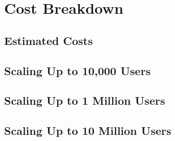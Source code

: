 \chapter{Cost Breakdown}
\section{Estimated Costs}
\section{Scaling Up to 10,000 Users}
\section{Scaling Up to 1 Million Users}
\section{Scaling Up to 10 Million Users}